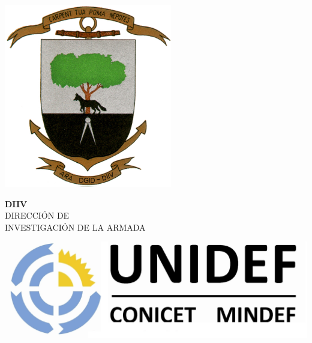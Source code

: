 
	\noindent
	\begin{minipage}[c][60mm][c]{1.0\linewidth} 
			\begin{minipage}[c]{0.39\linewidth}
				\centering
				\includegraphics[width=0.55\textwidth]{graficos/ESCUDO.jpg}
			\end{minipage}
			\hspace*{1pc}
			\begin{minipage}[c]{0.60\linewidth}
				\begin{center}
					\Huge{\textbf{DIIV}}\\
					\Large{DIRECCIÓN DE\\ 
					INVESTIGACIÓN DE LA ARMADA}\\
				\end{center}
			\end{minipage}			
			\begin{minipage}[c]{1.0\linewidth}
				\hfill\vspace{4mm}
			\end{minipage}
			\begin{minipage}[c]{0.40\linewidth}
				\centering
				\includegraphics[width=1.0\textwidth]{graficos/LOGO_UNIDEF_SOLO.jpg}

\end{minipage}
\end{minipage}
